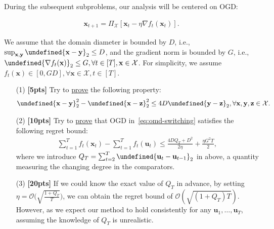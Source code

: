 \documentclass[a4paper]{article}
\numberwithin{equation}{section}
\theoremstyle{definition}
\theoremstyle{definition}
\def \X {\mathcal{X}}
\def \O {\mathcal{O}}
\def \u {\textbf{u}}
\def \x {\textbf{x}}
\def \y {\textbf{y}}
\def \z {\textbf{z}}
\let\norm\undefined
\DeclarePairedDelimiter\norm{\lVert}{\rVert}
\begin{document}
During the subsequent subproblems, our analysis will be centered on OGD:
\begin{tcolorbox}[top=-3pt]
  \begin{align}
    \x_{t+1} = \Pi_{\X}\left[\x_t  - \eta \nabla f_t(\x_t)\right].\label{eq:omd-switching}
  \end{align}
\end{tcolorbox}
We assume that the domain diameter is bounded by $D$, i.e., $\sup_{\x, \y} \norm{\x - \y}_2 \leq D$, and the gradient norm is bounded by $G$, i.e., $\norm{\nabla f_t(\x)}_2 \leq G, \forall t \in [T], \x \in \X$. For simplicity, we assume $f_t(\x) \in [0, GD], \forall \x \in \X, t\in [T]$.
\begin{enumerate} 
  \item[(1)] \textbf{[5pts]} Try to \underline{prove} the following property:
  \begin{align*}
    \norm{\x - \y}_2^2 - \norm{\x - \z}_2^2 \leq 4D\norm{\y - \z}_2, \forall \x, \y, \z \in \X.
  \end{align*}
  \item[(2)] \textbf{[10pts]} Try to \underline{prove} that OGD in~\eqref{eq:omd-switching} satisfies the following regret bound:
  \begin{align}
    \label{eq:switching-ogd-bound}
    \sum_{t=1}^T f_t(\x_t) - \sum_{t=1}^T f_t(\u_t) \leq \frac{4DQ_T + D^2}{2\eta} + \frac{\eta G^2T}{2} ,
  \end{align}
  where we introduce $Q_T = \sum_{t=2}^T \norm{\u_t - \u_{t-1}}_2$ in above, a quantity measuring the changing degree in the comparators.
  \item[(3)] \textbf{[20pts]} If we could know the exact value of $Q_T$ in advance, by setting $\eta = \O\big(\sqrt{\frac{1+Q_T}{T}}\big)$, we can obtain the regret bound of $\O(\sqrt{(1+Q_T)T})$. However, as we expect our method to hold consistently for any $\u_1, \dots, \u_T$, assuming the knowledge of $Q_T$ is unrealistic. 
  

\end{enumerate}
\end{document}
